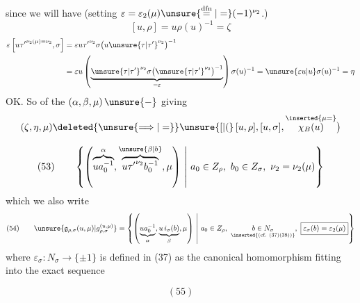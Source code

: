 since we will have
(setting \(\varepsilon=\varepsilon_2(\mu)
\unsure{\overset{\mathrm{dfn}}{=}|=}
(-1)^{\nu_2}\).)
\[
[u,\rho]=u\rho(u)^{-1}=\zeta
\]
\[
\begin{aligned}
\varepsilon
\left[u{\tau'}^{\nu_2(\mu)=\nu_2},\sigma\right]
&=\varepsilon u{\tau'}^{\nu_2}
\sigma\bigl(u\unsure{\tau|\tau'}^{\nu_2}\bigr)^{-1}\\
&=\varepsilon u
\left(\underbrace{
\unsure{\tau|\tau'}^{\nu_2}
\sigma\bigl(\unsure{\tau|\tau'}^{\nu_2}\bigr)^{-1}
}_{=\varepsilon}\right)\sigma(u)^{-1}
=\unsure{\varepsilon u|u}\sigma(u)^{-1}=\eta
\end{aligned}
\]
OK. So
of the \((\alpha,\beta,\mu)\,\unsure{-}\)
giving 
\[
(\zeta,\eta,\mu)\deleted{\unsure{\Longrightarrow|=}}
\unsure{[|(}\,[u,\rho],[u,\sigma],
\overset{\inserted{\mu=}}{\chi_B(u)}\bigr)
\]


\[
(53)\qquad
\left\{\left(
\overbrace{ua_0^{-1}}^{\alpha},
\overbrace{u{\tau'}^{\nu_2}b_0^{-1}}^{\unsure{\beta|b}},
\mu\right)
\ \middle|\ a_0\in Z_\rho,\ b_0\in Z_\sigma,\
\nu_2=\nu_2(\mu)\right\}
\]
\inserted{\[
\bigl(=(ua_0^{-1},ub^{-1},\mu)\unsure{\}}
\quad\text{where}\quad b=b_0{\tau'}^{\unsure{\nu_2}}
\]}
which we also write
\[
(54)\qquad
\unsure{\mathfrak{g}_{\rho,\sigma}(u,\mu)|g_{\rho,\sigma}^{(u,\mu)}}
=
\left\{\left(
\underbrace{ua_0^{-1}}_{\alpha},
\underbrace{u\,i_\sigma(b)}_{\beta},
\mu\right)
\ \middle|\ 
a_0\in Z_\rho,\ 
\underset{\inserted{\text{(cf. (37)(38))}}}{b\in N_\sigma},\
\boxed{\varepsilon_\sigma(b)=\varepsilon_2(\mu)}
\right\}
\]
where \(\varepsilon_\sigma:N_\sigma\longrightarrow\{\pm1\}\)
is defined in (37) as the canonical homomorphism
fitting into the exact sequence
\begin{samepage}
\[
(55)
\]
\diagram{\begin{tikzcd}[ampersand replacement=\&]
1\arrow[r]\&Z_\sigma\arrow[r]\&N_\sigma
\arrow[r,"\varepsilon_\sigma"]\&
\underbrace{\{\pm1\}}_{\simeq\{1,\tau'\}}\arrow[r]\&1.
\end{tikzcd}}
\end{samepage}

